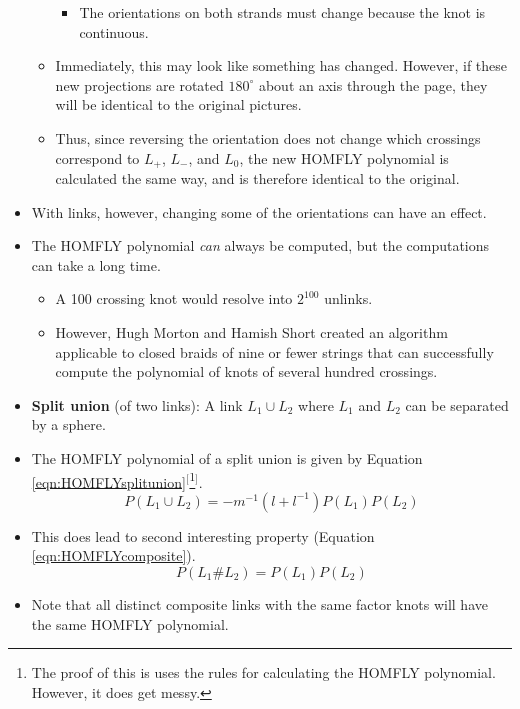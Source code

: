 \documentclass[titlepage]{article}
\numberwithin{figure}{section}
\numberwithin{table}{section}
\numberwithin{equation}{section}
\begin{document}
\begin{itemize}
\begin{itemize}
\begin{itemize}
            \item The orientations on both strands must change because the knot is continuous.
        \end{itemize}
        \item Immediately, this may look like something has changed. However, if these new projections are rotated $180^\circ$ about an axis through the page, they will be identical to the original pictures.
        \item Thus, since reversing the orientation does not change which crossings correspond to $L_+$, $L_-$, and $L_0$, the new HOMFLY polynomial is calculated the same way, and is therefore identical to the original.
    \end{itemize}
    \item With links, however, changing some of the orientations can have an effect.
    \item The HOMFLY polynomial \emph{can} always be computed, but the computations can take a long time.
    \begin{itemize}
        \item A 100 crossing knot would resolve into $2^{100}$ unlinks.
        \item However, Hugh Morton and Hamish Short created an algorithm applicable to closed braids of nine or fewer strings that can successfully compute the polynomial of knots of several hundred crossings.
    \end{itemize}
    \item \textbf{Split union} (of two links): A link $L_1\cup L_2$ where $L_1$ and $L_2$ can be separated by a sphere.
    \item The HOMFLY polynomial of a split union is given by Equation \ref{eqn:HOMFLYsplitunion}$^[$\footnote{The proof of this is uses the rules for calculating the HOMFLY polynomial. However, it does get messy.}$^]$.
    \begin{equation}\label{eqn:HOMFLYsplitunion}
        P(L_1\cup L_2)=-m^{-1}\left( l+l^{-1} \right)P(L_1)P(L_2)
    \end{equation}
    \item This does lead to second interesting property (Equation \ref{eqn:HOMFLYcomposite}).
    \begin{equation}\label{eqn:HOMFLYcomposite}
        P(L_1\#L_2)=P(L_1)P(L_2)
    \end{equation}
    \item Note that all distinct composite links with the same factor knots will have the same HOMFLY polynomial.

\end{itemize}
\end{document}
